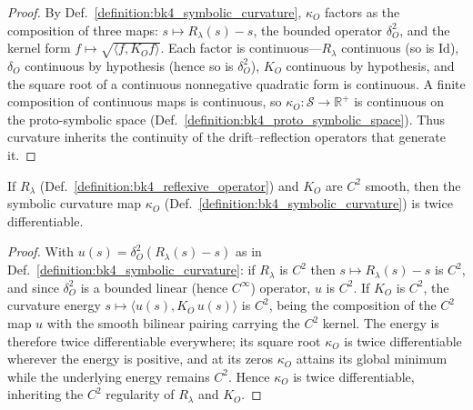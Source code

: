 \begin{proof}
\label{proof:bk4_curvature_continuity}
\leavevmode
By Def.~\ref{definition:bk4_symbolic_curvature}, $\kappa_O$ factors as the composition of three maps: $s \mapsto R_\lambda(s) - s$, the bounded operator $\delta_O^2$, and the kernel form $f \mapsto \sqrt{\langle f, K_O f\rangle}$. Each factor is continuous---$R_\lambda$ continuous (so is $\mathrm{Id}$), $\delta_O$ continuous by hypothesis (hence so is $\delta_O^2$), $K_O$ continuous by hypothesis, and the square root of a continuous nonnegative quadratic form is continuous. A finite composition of continuous maps is continuous, so $\kappa_O : \mathcal{S} \to \mathbb{R}^+$ is continuous on the proto-symbolic space (Def.~\ref{definition:bk4_proto_symbolic_space}). Thus curvature inherits the continuity of the drift--reflection operators that generate it.
\end{proof}

\begin{theorem}[Differentiability]
\label{theorem:bk4_curvature_differentiability}
If $R_\lambda$ (Def.~\ref{definition:bk4_reflexive_operator}) and $K_O$ are $C^2$ smooth, then the symbolic curvature map $\kappa_O$ (Def.~\ref{definition:bk4_symbolic_curvature}) is twice differentiable.
\end{theorem}

\begin{proof}
\label{proof:bk4_curvature_differentiability}
\leavevmode
With $u(s) = \delta_O^2(R_\lambda(s) - s)$ as in Def.~\ref{definition:bk4_symbolic_curvature}: if $R_\lambda$ is $C^2$ then $s \mapsto R_\lambda(s) - s$ is $C^2$, and since $\delta_O^2$ is a bounded linear (hence $C^\infty$) operator, $u$ is $C^2$. If $K_O$ is $C^2$, the curvature energy $s \mapsto \langle u(s), K_O\,u(s)\rangle$ is $C^2$, being the composition of the $C^2$ map $u$ with the smooth bilinear pairing carrying the $C^2$ kernel. The energy is therefore twice differentiable everywhere; its square root $\kappa_O$ is twice differentiable wherever the energy is positive, and at its zeros $\kappa_O$ attains its global minimum while the underlying energy remains $C^2$. Hence $\kappa_O$ is twice differentiable, inheriting the $C^2$ regularity of $R_\lambda$ and $K_O$.
\end{proof}

